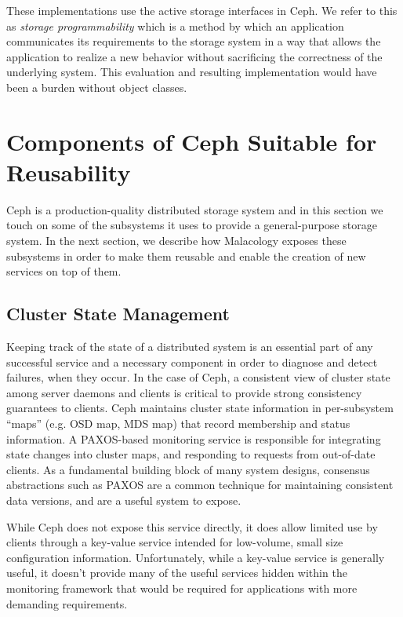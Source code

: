 \documentclass[10pt,twocolumn]{article}
\begin{document}
These implementations use the active storage interfaces in Ceph. We
refer to this as \emph{storage programmability} which is a method by
which an application communicates its requirements to the storage system
in a way that allows the application to realize a new behavior without
sacrificing the correctness of the underlying system. This evaluation
and resulting implementation would have been a burden without object
classes.
\fi

\section{Components of Ceph Suitable for Reusability}\label{re-usable-components-in-ceph}

\label{background}

Ceph is a production-quality distributed storage system and in this section we
touch on some of the subsystems it uses to provide a general-purpose
storage system. In the next section, we describe how Malacology exposes these
subsystems in order to make them reusable and enable the creation of new services on top of them.

\subsection{Cluster State Management}
\label{consistencyversioning-of-cluster-state}

Keeping track of the state of a distributed system is an essential part of any 
successful service and a necessary component in order to diagnose and detect 
failures, when they occur. In the case of Ceph, a consistent view of cluster 
state among server daemons and clients is critical
to provide strong consistency guarantees to clients. Ceph maintains cluster
state information in per-subsystem ``maps'' (e.g. OSD map, MDS map) that
record membership and status information. A PAXOS-based monitoring service is
responsible for integrating state changes into cluster maps, and responding to
requests from out-of-date clients. As a fundamental building block of many
system designs, consensus abstractions such as PAXOS are a common technique
for maintaining consistent data versions, and are a useful system to expose.

While Ceph does not expose this service directly, it does allow limited use by
clients through a key-value service intended for low-volume, small size
configuration information. Unfortunately, while a key-value service is
generally useful, it doesn't provide many of the useful services hidden within
the monitoring framework that would be required for applications with more
demanding requirements.
\end{document}
